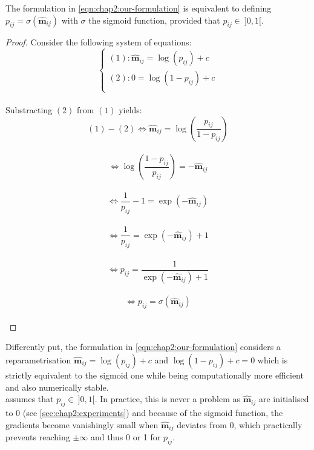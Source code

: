 \begin{proposition}
  \label{prop:chap2:probability-interpretation}
  The formulation in \cref{eqn:chap2:our-formulation} is equivalent to defining
  $p_{ij} = \sigma(\bm{\hat{m}}_{ij})$ with $\sigma$ the sigmoid function,
  provided that $p_{ij}\in ~ ]0,1[$.
\end{proposition}
\vspace*{\baselineskip}

\begin{proof}
  Consider the following system of equations:\\
  $$
  \left\{ 
    \begin{array}{l}
      (1): \bm{\hat{m}}_{ij} = \log(p_{ij})+c\\ 
      (2): 0 = \log(1-p_{ij})+c\\
    \end{array} 
    \right.
  $$\\
  Substracting $(2)$ from $(1)$ yields:\\
  $$ (1) - (2) \Leftrightarrow \bm{\hat{m}}_{ij} = \displaystyle\log\left( \frac{p_{ij}}{1 - p_{ij}} \right)$$\\
  $$ \Leftrightarrow \log\left(\frac{1-p_{ij}}{p_{ij}} \right) = -
  \bm{\hat{m}}_{ij}$$\\
  $$ \Leftrightarrow \frac{1}{p_{ij}} - 1 = \exp(-\bm{\hat{m}}_{ij})$$\\
  $$ \Leftrightarrow \frac{1}{p_{ij}} = \exp(-\bm{\hat{m}}_{ij}) + 1$$\\
  $$ \Leftrightarrow p_{ij} = \frac{1}{\exp(-\bm{\hat{m}}_{ij}) + 1}$$\\
  $$ \Leftrightarrow p_{ij} = \sigma(\bm{\hat{m}}_{ij})$$\\

\end{proof}


Differently put, the formulation in \cref{eqn:chap2:our-formulation} considers a
reparametrisation $\bm{\hat{m}}_{ij} = \log(p_{ij})+c$ and $\log(1-p_{ij})+ c =0$ which is strictly
equivalent to the sigmoid one while being computationally more efficient and
also numerically stable.\\

 assumes that $p_{ij}\in ~ ]0,1[$.
In practice, this is never a problem as $\bm{\hat{m}}_{ij}$ are initialised to 0
(see \cref{sec:chap2:experiments}) and because of the sigmoid function, the
gradients become vanishingly small when $\bm{\hat{m}}_{ij}$ deviates from 0,
which practically prevents reaching $\pm\infty$ and thus 0 or 1 for $p_{ij}$.\\


